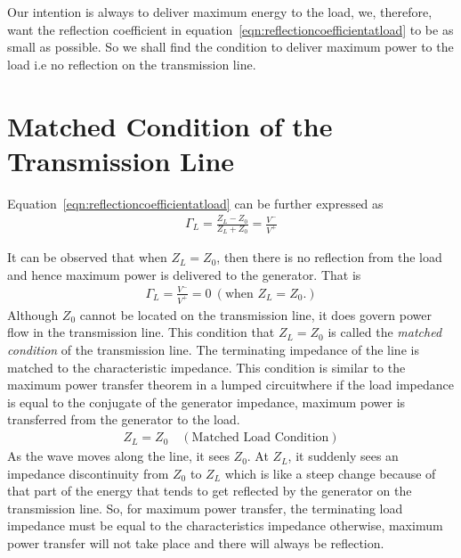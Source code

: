 Our intention is always to deliver maximum energy to the load, we, therefore, want the reflection coefficient in equation~\eqref{eqn:reflectioncoefficientatload} to be as small as possible. So we shall find the condition to deliver maximum power to the load i.e no reflection on the transmission line.

\section{Matched Condition of the Transmission Line}\label{lec:lec4}
Equation~\eqref{eqn:reflectioncoefficientatload} can be further expressed as
\begin{align*}
\Gamma_L = \frac{Z_L - Z_0}{Z_L + Z_0} = \frac{V^-}{V^+}
\end{align*}

It can be observed that when $Z_L = Z_0$, then there is no reflection from the load and hence maximum power is delivered to the generator. That is
\begin{align*}
\Gamma_L = \frac{V^-}{V^+} = 0\ (\text{when }Z_L = Z_0.) 
\end{align*}
Although $Z_0$ cannot be located on the transmission line, it does govern power flow in the transmission line. This condition that $Z_L = Z_0$ is called the \emph{matched condition} of the transmission line. The terminating impedance of the line is matched to the characteristic impedance. This condition is similar to the maximum power transfer theorem in a lumped circuit\textemdash\;where if the load impedance is equal to the conjugate of the generator impedance, maximum power is transferred from the generator to the load.
\begin{align*}
Z_L = Z_0 \quad (\text{Matched Load Condition})
\end{align*}
As the wave moves along the line, it sees $Z_0$. At $Z_L$, it suddenly sees an impedance discontinuity from $Z_0$ to $Z_L$ which is like a steep change because of that part of the energy that tends to get reflected by the generator on the transmission line. So, for maximum power transfer, the terminating load impedance must be equal to the characteristics impedance otherwise, maximum power transfer will not take place and there will always be reflection.

